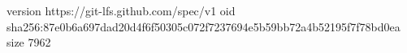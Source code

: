 version https://git-lfs.github.com/spec/v1
oid sha256:87e0b6a697dad20d4f6f50305c072f7237694e5b59bb72a4b52195f7f78bd0ea
size 7962
